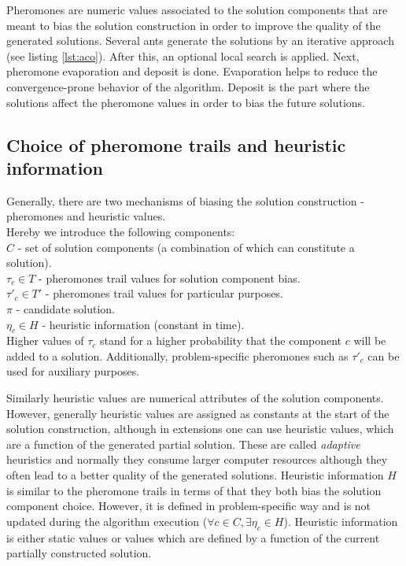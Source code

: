 \documentclass[11pt,a4paper,oneside]{book}
\begin{document}
Pheromones are numeric values associated to the solution components that are meant to bias the solution construction in order to improve the quality of the generated solutions. Several ants generate the solutions by an iterative approach (see listing \ref{lst:aco}). After this, an optional local search is applied. Next, pheromone evaporation and deposit is done. Evaporation helps to reduce the convergence-prone behavior of the algorithm. Deposit is the part where the solutions affect the pheromone values in order to bias the future solutions.

\subsection{Choice of pheromone trails and heuristic information}

Generally, there are two mechanisms of biasing the solution construction - pheromones and heuristic values. \\
Hereby we introduce the following components: \\
$C$ - set of solution components (a combination of which can constitute a solution). \\
$\tau_c \in T$ - pheromones trail values for solution component bias. \\
$\tau'_c \in T'$ - pheromones trail values for particular purposes. \\
$\pi$ - candidate solution. \\
$\eta_c \in H$ - heuristic information (constant in time). \\

Higher values of $\tau_c$ stand for a higher probability that the component $c$ will be added to a solution. Additionally, problem-specific pheromones such as $\tau'_c$ can be used for auxiliary purposes. 

Similarly heuristic values are numerical attributes of the solution components. However, generally heuristic values are assigned as constants at the start of the solution construction, although in extensions one can use heuristic values, which are a function of the generated partial solution. These are called \emph{adaptive} heuristics and normally they consume larger computer resources although they often lead to a better quality of the generated solutions. Heuristic information $H$ is similar to the pheromone trails in terms of that they both bias the solution component choice. However, it is defined in problem-specific way and is not updated during the algorithm execution ($\forall c \in C, \exists \eta_c \in H$). Heuristic information is either static values or values which are defined by a function of the current partially constructed solution. 
\end{document}
